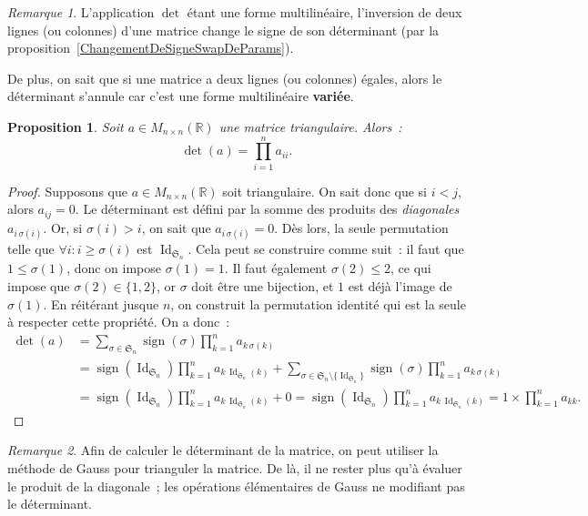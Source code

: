 \documentclass{article}
\DeclareMathOperator{\Id}{Id}
\DeclareMathOperator{\sign}{sign}
\newcommand{\R}{\mathbb R}
\newcommand{\M}[3]{M_{#1 \times #2}(#3)}
\newcommand{\Perm}{\mathfrak{S}}
\newtheorem{prp}[thm]{Proposition}
\theoremstyle{definition}
\theoremstyle{remark}
\newtheorem*{rmq}{Remarque}
\begin{document}
		\begin{rmq} L'application $\det$ étant une forme multilinéaire, l'inversion de deux lignes (ou colonnes) d'une matrice change le signe de son déterminant
		(par la proposition~\ref{ChangementDeSigneSwapDeParams}).
		
		De plus, on sait que si une matrice a deux lignes (ou colonnes) égales, alors le déterminant s'annule car c'est une forme multilinéaire \textbf{variée}.
		\end{rmq}

		\begin{prp}\label{detMatriceTriangulaire} Soit $a \in \M nn\R$ une matrice triangulaire. Alors~:
		\[\det(a) = \prod_{i=1}^na_{ii}.\] \end{prp}

		\begin{proof} Supposons que $a \in \M nn\R$ soit triangulaire. On sait donc que si $i < j$, alors $a_{ij} = 0$. Le déterminant est défini par la somme des produits
		des \textit{diagonales} $a_{i\,\sigma(i)}$. Or, si $\sigma(i) > i$, on sait que $a_{i\,\sigma(i)} = 0$. Dès lors, la seule permutation telle que
		$\forall i : i \geq \sigma(i)$ est $\Id_{\Perm_n}$. Cela peut se construire comme suit~: il faut que $1 \leq \sigma(1)$, donc on impose $\sigma(1) = 1$. Il faut
		également $\sigma(2) \leq 2$, ce qui impose que $\sigma(2) \in \{1, 2\}$, or $\sigma$ doit être une bijection, et $1$ est déjà l'image de $\sigma(1)$. En
		réitérant jusque $n$, on construit la permutation identité qui est la seule à respecter cette propriété. On a donc~:
		\[\begin{aligned}
			\det(a) &= \sum_{\sigma\in\Perm_n}\sign(\sigma)\prod_{k=1}^na_{k\,\sigma(k)} \\
			&= \sign(\Id_{\Perm_n})\prod_{k=1}^na_{k\,\Id_{\Perm_n}(k)} + \sum_{\sigma \in \Perm_n \setminus \{\Id_{\Perm_n}\}}\sign(\sigma)\prod_{k=1}^na_{k\,\sigma(k)} \\
			&= \sign(\Id_{\Perm_n})\prod_{k=1}^na_{k\,\Id_{\Perm_n}(k)} + 0 = \sign(\Id_{\Perm_n})\prod_{k=1}^na_{k\,\Id_{\Perm_n}(k)} = 1 \times \prod_{k=1}^na_{kk}.
		\end{aligned}\] \end{proof}

		\begin{rmq} Afin de calculer le déterminant de la matrice, on peut utiliser la méthode de Gauss pour trianguler la matrice. De là, il ne rester plus qu'à
		évaluer le produit de la diagonale~; les opérations élémentaires de Gauss ne modifiant pas le déterminant. \end{rmq}
\end{document}
